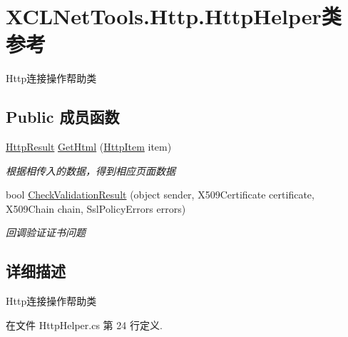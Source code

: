 \hypertarget{class_x_c_l_net_tools_1_1_http_1_1_http_helper}{\section{X\-C\-L\-Net\-Tools.\-Http.\-Http\-Helper类 参考}
\label{class_x_c_l_net_tools_1_1_http_1_1_http_helper}
}


Http连接操作帮助类  


\subsection*{Public 成员函数}
\begin{DoxyCompactItemize}
\item 
\hyperlink{class_x_c_l_net_tools_1_1_entity_1_1_http_1_1_http_result}{Http\-Result} \hyperlink{class_x_c_l_net_tools_1_1_http_1_1_http_helper_a1115d0f405e29654961ad3bcd5272bdf}{Get\-Html} (\hyperlink{class_x_c_l_net_tools_1_1_entity_1_1_http_1_1_http_item}{Http\-Item} item)
\begin{DoxyCompactList}\small\item\em 根据相传入的数据，得到相应页面数据 \end{DoxyCompactList}\item 
bool \hyperlink{class_x_c_l_net_tools_1_1_http_1_1_http_helper_aed104c08e4f4e44e2f3b7529e85c2848}{Check\-Validation\-Result} (object sender, X509\-Certificate certificate, X509\-Chain chain, Ssl\-Policy\-Errors errors)
\begin{DoxyCompactList}\small\item\em 回调验证证书问题 \end{DoxyCompactList}\end{DoxyCompactItemize}


\subsection{详细描述}
Http连接操作帮助类 



在文件 Http\-Helper.\-cs 第 24 行定义.



